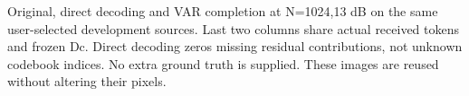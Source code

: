 Original, direct decoding and VAR completion at N=1024,13 dB on the same user-selected development sources. Last two columns share actual received tokens and frozen Dc. Direct decoding zeros missing residual contributions, not unknown codebook indices. No extra ground truth is supplied. These images are reused without altering their pixels.
